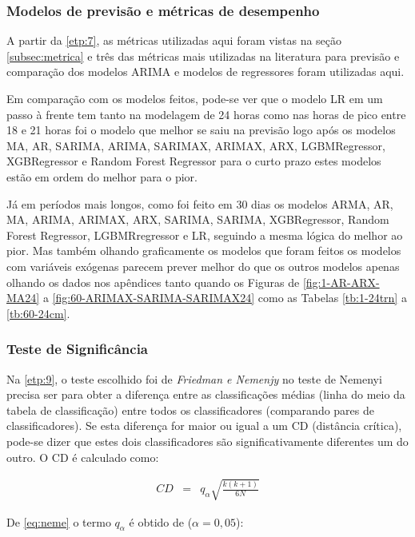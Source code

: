 \subsubsection{Modelos de previs\~ao e m\'etricas de desempenho}\label{subsubsec:modelos}

A partir da \ref{etp:7}, as métricas utilizadas aqui foram vistas na seção \ref{subsec:metrica} e três das métricas mais utilizadas na literatura para previsão e comparação dos modelos ARIMA e modelos de regressores foram utilizadas aqui.

 Em comparação com os modelos feitos, pode-se ver que o modelo LR em um passo à frente tem tanto na modelagem de 24 horas como nas horas de pico entre 18 e 21 horas foi o modelo que melhor se saiu na previsão logo após os modelos MA, AR, SARIMA, ARIMA, SARIMAX, ARIMAX, ARX, LGBMRegressor, XGBRegressor e Random Forest Regressor para o curto prazo estes modelos estão em ordem do melhor para o pior.

   Já em períodos mais longos, como foi feito em 30 dias os modelos ARMA, AR, MA, ARIMA, ARIMAX, ARX, SARIMA, SARIMA, XGBRegressor, Random Forest Regressor, LGBMRregressor e LR, seguindo a mesma lógica do melhor ao pior. Mas também olhando graficamente os modelos que foram feitos os modelos com variáveis exógenas parecem prever melhor do que os outros modelos apenas olhando os dados nos apêndices tanto quando os Figuras de \ref{fig:1-AR-ARX-MA24} a \ref{fig:60-ARIMAX-SARIMA-SARIMAX24} como as Tabelas \ref{tb:1-24trn} a \ref{tb:60-24cm}.   
    
  
    \subsubsection{Teste de Signific\^ancia}
    
 Na \ref{etp:9}, o teste escolhido foi de \textit{Friedman e Nemenjy} no teste de Nemenyi precisa ser para obter a diferença entre as classificações médias (linha do meio da tabela de classificação) entre todos os classificadores (comparando pares de classificadores). Se esta diferença for maior ou igual a um CD (distância crítica), pode-se dizer que estes dois classificadores são significativamente diferentes um do outro. O CD é calculado como:
    
    
    \begin{eqnarray}
    	C D&=&q_\alpha \sqrt{\frac{k(k+1)}{6 N}}\label{eq:neme}
    \end{eqnarray}

De \eqref{eq:neme} o termo $q_\alpha$ é obtido de ($\alpha=0,05$):

